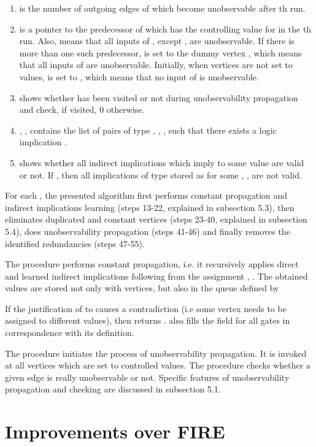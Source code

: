 \documentclass[conference]{IEEEtran} \usepackage{times}
\begin{document}
\begin{enumerate}
\item   is 
the number of outgoing edges of  which become unobservable after
th run.
\item  is
a pointer to the predecessor of  which has the controlling value
for  in the th run. Also,  means that all
inputs of , except , are unobservable.  If there is more than
one such predecessor,  is set to the dummy vertex ,
which means that all inputs of  are unobservable. Initially, when
vertices are not set to values,  is set to , which
means that no input of  is unobservable.
\item  shows whether 
has been visited or not during unobservability propagation and check,
 if visited, 0 otherwise.
\item , , contains the 
list of pairs of type , , , such that
there exists a logic implication .
\item  shows whether 
all indirect implications which imply  to some value are valid or
not.  If , then all implications of type
 stored as  for some , ,
are not valid.
\end{enumerate}

For each , the presented algorithm first performs constant propagation and
indirect implications learning (steps 13-22, explained in subsection
5.3), then eliminates duplicated and constant vertices (steps 23-40,
explained in subsection 5.4), does unobservability propagation
(steps 41-46) and finally removes the
identified redundancies (steps 47-55).
 
The procedure  performs constant
propagation, i.e. it recursively applies direct and learned indirect
implications following from the assignment , . The obtained values are stored not only with vertices, but
also in the queue  defined by

If the justification of  to  causes a contradiction 
(i.e some vertex needs to be assigned to different values), then
 returns .
 also fills the field
 for all gates  in correspondence with its
definition.

The procedure 
 initiates the process of unobservability
propagation.  It is invoked at all vertices which are set to
controlled values.  The procedure
 checks whether a given edge
 is really unobservable or not. Specific features of unobservability
propagation and checking are discussed in subsection 5.1.

\section{Improvements over FIRE}
\label{impr}
\end{document}
